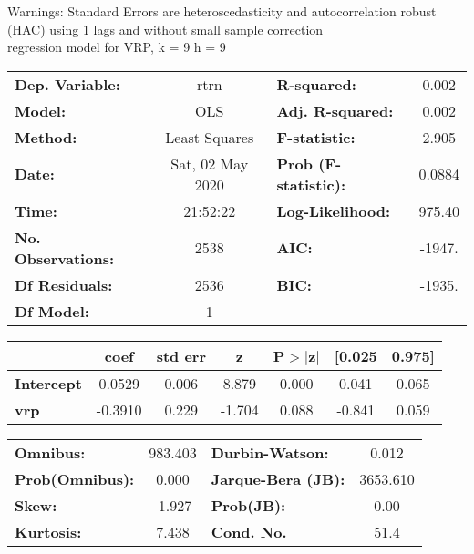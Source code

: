 Warnings: \newline
 [1] Standard Errors are heteroscedasticity and autocorrelation robust (HAC) using 1 lags and without small sample correction\\ 

regression model for VRP, k = 9 h = 9\begin{center}
\begin{tabular}{lclc}
\toprule
\textbf{Dep. Variable:}    &       rtrn       & \textbf{  R-squared:         } &     0.002   \\
\textbf{Model:}            &       OLS        & \textbf{  Adj. R-squared:    } &     0.002   \\
\textbf{Method:}           &  Least Squares   & \textbf{  F-statistic:       } &     2.905   \\
\textbf{Date:}             & Sat, 02 May 2020 & \textbf{  Prob (F-statistic):} &   0.0884    \\
\textbf{Time:}             &     21:52:22     & \textbf{  Log-Likelihood:    } &    975.40   \\
\textbf{No. Observations:} &        2538      & \textbf{  AIC:               } &    -1947.   \\
\textbf{Df Residuals:}     &        2536      & \textbf{  BIC:               } &    -1935.   \\
\textbf{Df Model:}         &           1      & \textbf{                     } &             \\
\bottomrule
\end{tabular}
\begin{tabular}{lcccccc}
                   & \textbf{coef} & \textbf{std err} & \textbf{z} & \textbf{P$> |$z$|$} & \textbf{[0.025} & \textbf{0.975]}  \\
\midrule
\textbf{Intercept} &       0.0529  &        0.006     &     8.879  &         0.000        &        0.041    &        0.065     \\
\textbf{vrp}       &      -0.3910  &        0.229     &    -1.704  &         0.088        &       -0.841    &        0.059     \\
\bottomrule
\end{tabular}
\begin{tabular}{lclc}
\textbf{Omnibus:}       & 983.403 & \textbf{  Durbin-Watson:     } &    0.012  \\
\textbf{Prob(Omnibus):} &   0.000 & \textbf{  Jarque-Bera (JB):  } & 3653.610  \\
\textbf{Skew:}          &  -1.927 & \textbf{  Prob(JB):          } &     0.00  \\
\textbf{Kurtosis:}      &   7.438 & \textbf{  Cond. No.          } &     51.4  \\
\bottomrule
\end{tabular}
\end{center}

